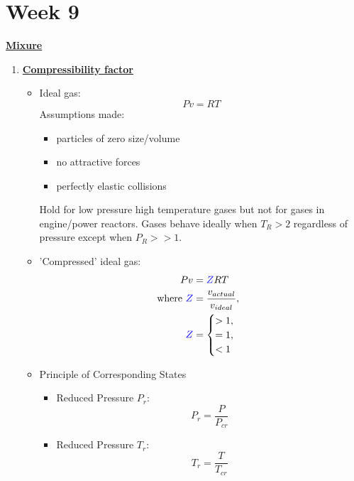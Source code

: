 \section{Week 9}
\Large \textbf{{\color{red}\underline{Mixure}}}

\begin{enumerate}
    \item \textbf{\ul{Compressibility factor}}
    \begin{itemize}
        \item Ideal gas: 
        \begin{equation*}
            Pv = RT
        \end{equation*}
        Assumptions made:
        \begin{itemize}
            \item particles of zero size/volume
            \item no attractive forces
            \item perfectly elastic collisions
        \end{itemize}
        Hold for {\color{green}low pressure high temperature gases} but not for {\color{red}gases in engine/power reactors}. Gases behave ideally when $T_R > 2$ regardless of pressure except when $P_R >> 1$.
        \item 'Compressed' ideal gas:
        \begin{align*}
            Pv &= {\color{blue}Z}RT\\
            \text{where } {\color{blue}Z} &= \frac{v_{actual}}{v_{ideal}}, \\
            {\color{blue}Z} &= \begin{cases} 
            >1, \\
            =1, \\
            < 1
            \end{cases}
        \end{align*}
        \item {{\color{blue}Principle of Corresponding States}}
        \begin{itemize}
            \item {\color{blue}Reduced Pressure $P_r$}:
            \begin{equation*}
                P_r = \frac{P}{P_{cr}}
            \end{equation*}
            \item {\color{blue}Reduced Pressure $T_r$}:
            \begin{equation*}
                T_r = \frac{T}{T_{cr}}

\end{equation*}
\end{itemize}
\end{itemize}
\end{enumerate}

